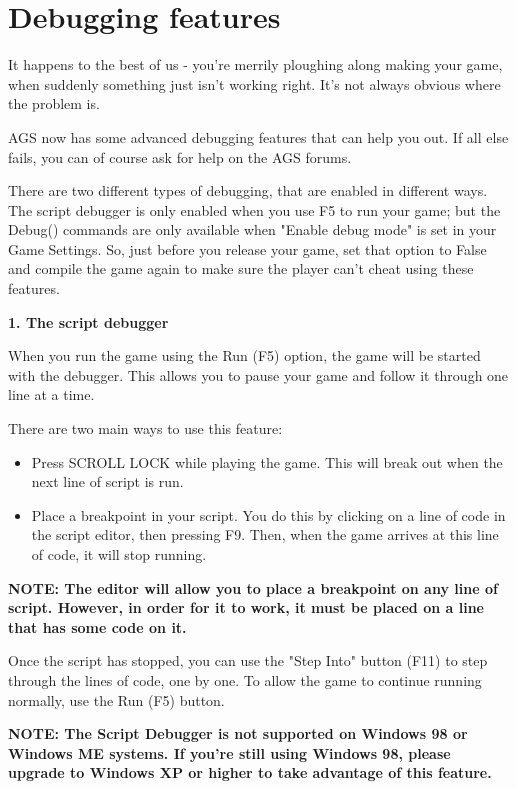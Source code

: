 \section{Debugging features}\label{Debuggingfeatures}%

It happens to the best of us - you're merrily ploughing along making your game, when
suddenly something just isn't working right. It's not always obvious where the problem is.

AGS now has some advanced debugging features that can help you out. If all else fails, you
can of course ask for help on the AGS forums.

There are two different types of debugging, that are enabled in different ways. The script
debugger is only enabled when you use F5 to run your game; but the Debug() commands are
only available when "Enable debug mode" is set in your Game Settings. So, just before you
release your game, set that option to False and compile the game again to make sure the
player can't cheat using these features.

\bf{1. The script debugger}

When you run the game using the Run (F5) option, the game will be started with the debugger.
This allows you to pause your game and follow it through one line at a time.

There are two main ways to use this feature:
\begin{itemize}
\item Press SCROLL LOCK while playing the game. This will break out when the next line of script is run.
\item Place a breakpoint in your script. You do this by clicking on a line of code
  in the script editor, then pressing F9. Then, when the game arrives at this
  line of code, it will stop running.
\end{itemize}

\bf{NOTE:} The editor will allow you to place a breakpoint on any line of script.
However, in order for it to work, it must be placed on a line that has some code on it.

Once the script has stopped, you can use the "Step Into" button (F11) to step through
the lines of code, one by one. To allow the game to continue running normally, use the Run (F5) button.

\bf{NOTE:} The Script Debugger is not supported on Windows 98 or Windows ME systems.
If you're still using Windows 98, please upgrade to Windows XP or higher to take advantage
of this feature.

